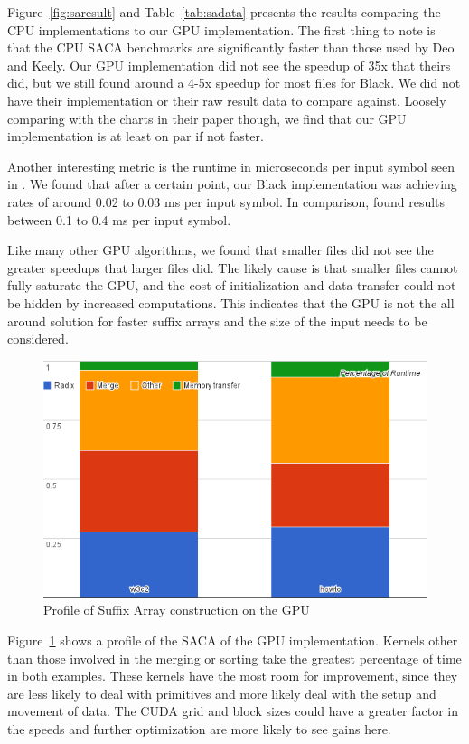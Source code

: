 Figure~\ref{fig:saresult} and Table~\ref{tab:sadata} presents the results comparing the CPU implementations to our GPU implementation.
The first thing to note is that the CPU SACA benchmarks are significantly faster than those used by Deo and Keely.
Our GPU implementation did not see the speedup of 35x that theirs did, but we still found around a 4-5x speedup for most files for Black.
We did not have their implementation or their raw result data to compare against.
Loosely comparing with the charts in their paper though, we find that our GPU implementation is at least on par if not faster.

Another interesting metric is the runtime in microseconds per input symbol seen in \cite{al2012comparison}.
We found that after a certain point, our Black implementation was achieving rates of around 0.02 to 0.03 ms per input symbol.
In comparison, \cite{al2012comparison} found results between 0.1 to 0.4 ms per input symbol.

Like many other GPU algorithms, we found that smaller files did not see the greater speedups that larger files did.
The likely cause is that smaller files cannot fully saturate the GPU, and the cost of initialization and data transfer could not be hidden by increased computations.
This indicates that the GPU is not the all around solution for faster suffix arrays and the size of the input needs to be considered.

\begin{figure}[ht!]
\centering
\includegraphics[width=1.0\textwidth]{images/saprofile.png}
\caption{Profile of Suffix Array construction on the GPU}
\label{fig:saprofile}
\end{figure}

Figure~\ref{fig:saprofile} shows a profile of the SACA of the GPU implementation.
Kernels other than those involved in the merging or sorting take the greatest percentage of time in both examples.
These kernels have the most room for improvement, since they are less likely to deal with primitives and more likely deal with the setup and movement of data.
The CUDA grid and block sizes could have a greater factor in the speeds and further optimization are more likely to see gains here.

